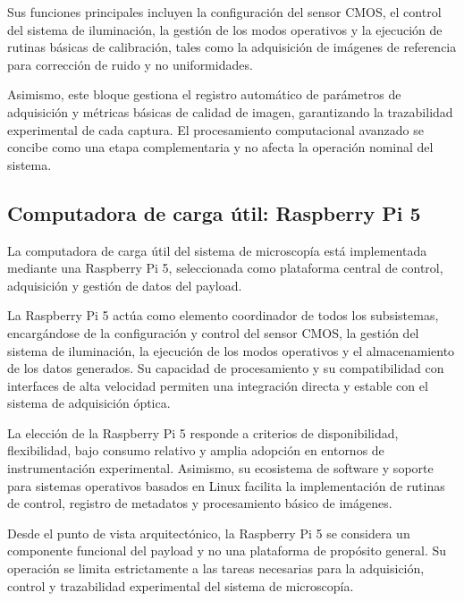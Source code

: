 Sus funciones principales incluyen la configuración del sensor CMOS, el control del sistema de iluminación, la gestión de los modos operativos y la ejecución de rutinas básicas de calibración, tales como la adquisición de imágenes de referencia para corrección de ruido y no uniformidades.

Asimismo, este bloque gestiona el registro automático de parámetros de adquisición y métricas básicas de calidad de imagen, garantizando la trazabilidad experimental de cada captura. El procesamiento computacional avanzado se concibe como una etapa complementaria y no afecta la operación nominal del sistema.

\subsection{Computadora de carga útil: Raspberry Pi 5}

La computadora de carga útil del sistema de microscopía está implementada mediante una Raspberry Pi 5, seleccionada como plataforma central de control, adquisición y gestión de datos del payload.

La Raspberry Pi 5 actúa como elemento coordinador de todos los subsistemas, encargándose de la configuración y control del sensor CMOS, la gestión del sistema de iluminación, la ejecución de los modos operativos y el almacenamiento de los datos generados. Su capacidad de procesamiento y su compatibilidad con interfaces de alta velocidad permiten una integración directa y estable con el sistema de adquisición óptica.

La elección de la Raspberry Pi 5 responde a criterios de disponibilidad, flexibilidad, bajo consumo relativo y amplia adopción en entornos de instrumentación experimental. Asimismo, su ecosistema de software y soporte para sistemas operativos basados en Linux facilita la implementación de rutinas de control, registro de metadatos y procesamiento básico de imágenes.

Desde el punto de vista arquitectónico, la Raspberry Pi 5 se considera un componente funcional del payload y no una plataforma de propósito general. Su operación se limita estrictamente a las tareas necesarias para la adquisición, control y trazabilidad experimental del sistema de microscopía.

